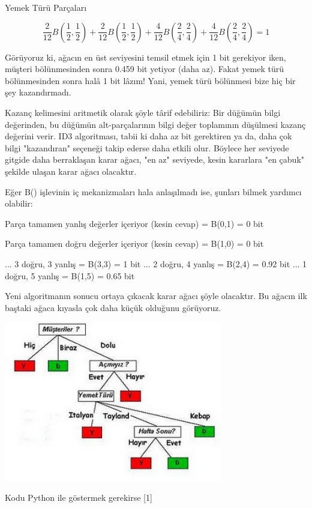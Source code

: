 \documentclass[12pt,fleqn]{article}\usepackage{../../common}
\begin{document}
Yemek Türü Parçaları

$$ 
\frac{2}{12}B(\frac{1}{2}, \frac{1}{2}) + 
\frac{2}{12}B(\frac{1}{2}, \frac{1}{2}) + 
\frac{4}{12}B(\frac{2}{4}, \frac{2}{4}) + 
\frac{4}{12}B(\frac{2}{4}, \frac{2}{4})  = 1
 $$

Görüyoruz ki, ağacın en üst seviyesini temsil etmek için 1 bit gerekiyor
iken, müşteri bölünmesinden sonra 0.459 bit yetiyor (daha az). Fakat yemek
türü bölünmesinden sonra halâ 1 bit lâzım! Yani, yemek türü bölünmesi bize
hiç bir şey kazandırmadı.

Kazanç kelimesini aritmetik olarak şöyle târif edebiliriz: Bir düğümün
bilgi değerinden, bu düğümün alt-parçalarının bilgi değer toplamının
düşülmesi kazanç değerini verir. ID3 algoritması, tabii ki daha az bit
gerektiren ya da, daha çok bilgi "kazandıran" seçeneği takip ederse daha
etkili olur. Böylece her seviyede gitgide daha berraklaşan karar ağacı, "en
az" seviyede, kesin kararlara "en çabuk" şekilde ulaşan karar ağacı
olacaktır.

Eğer B() işlevinin iç mekanizmaları hala anlaşılmadı ise, şunları bilmek
yardımcı olabilir:

Parça tamamen yanlış değerler içeriyor (kesin cevap) = B(0,1) = 0 bit

Parça tamamen doğru değerler  içeriyor (kesin cevap) = B(1,0)  = 0 bit

...   3 doğru, 3 yanlış = B(3,3)  = 1 bit 
...   2 doğru, 4 yanlış = B(2,4)  = 0.92 bit 
...   1 doğru, 5 yanlış = B(1,5)  = 0.65 bit 

Yeni algoritmanın sonucu ortaya çıkacak karar ağacı şöyle olacaktır. Bu
ağacın ilk baştaki ağaca kıyasla çok daha küçük olduğunu görüyoruz.

\includegraphics[height=7cm]{id3_agac_eniyi.jpg}

Kodu Python ile göstermek gerekirse [1]
\end{document}
